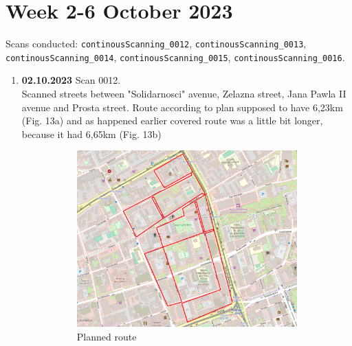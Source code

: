\documentclass[a4paper,12pt]{book}
\begin{document}
\section{Week 2-6 October 2023}
Scans conducted: \verb|continousScanning_0012|, \verb|continousScanning_0013|, \verb|continousScanning_0014|, \verb|continousScanning_0015|, \verb|continousScanning_0016|.\\
\begin{enumerate}
	\item \textbf{02.10.2023} Scan 0012. \\
	Scanned streets between "Solidarnosci" avenue, Zelazna street, Jana Pawla II avenue and Prosta street. Route according to plan supposed to have 6,23km (Fig. 13a) and as happened earlier covered route was a little bit longer, because it had 6,65km (Fig. 13b)
	\begin{figure}[H]
		\centering
		\begin{subfigure}{.77\textwidth}
			\centering
			\includegraphics[width=1\linewidth]{route_p12}
			\caption{Planned route}
			\label{fig:a12}
		\end{subfigure}%
		\linebreak
		\begin{subfigure}{.77\textwidth}
			\centering

\end{subfigure}
\end{figure}
\end{enumerate}
\end{document}

